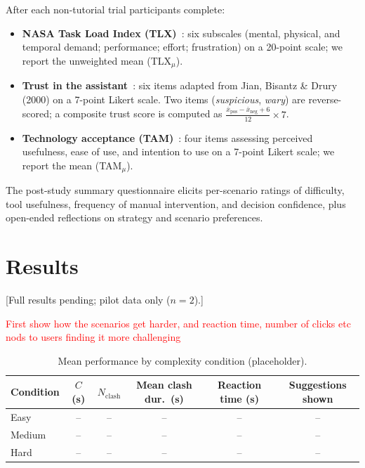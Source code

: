 \documentclass[10pt]{article}
\theoremstyle{definition}
\begin{document}
After each non-tutorial trial participants complete:
\begin{itemize}[noitemsep]
  \item \textbf{NASA Task Load Index (TLX)}~\cite{hart1988nasa}: six subscales (mental, physical, and temporal demand; performance; effort; frustration) on a 20-point scale; we report the unweighted mean (TLX$_\mu$).
  \item \textbf{Trust in the assistant}~\cite{jian2000foundations}: six items adapted from Jian, Bisantz \& Drury (2000) on a 7-point Likert scale. Two items (\textit{suspicious}, \textit{wary}) are reverse-scored; a composite trust score is computed as $\frac{\bar{x}_{\mathrm{pos}} - \bar{x}_{\mathrm{neg}} + 6}{12}\times 7$.
  \item \textbf{Technology acceptance (TAM)}~\cite{davis1989perceived}: four items assessing perceived usefulness, ease of use, and intention to use on a 7-point Likert scale; we report the mean (TAM$_\mu$).
\end{itemize}

The post-study summary questionnaire elicits per-scenario ratings of difficulty, tool usefulness, frequency of manual intervention, and decision confidence, plus open-ended reflections on strategy and scenario preferences.

\section{Results}\label{sec:results}
[Full results pending; pilot data only ($n = 2$).]

\textcolor{red}{First show how the scenarios get harder, and reaction time, number of clicks etc nods to users finding it more challenging}
\begin{table}[ht]
\centering
\caption{Mean performance by complexity condition (placeholder).}
\label{tab:perf}
\begin{tabular}{lccccc}
\toprule
Condition & $C$ (s) & $N_{\mathrm{clash}}$ & Mean clash dur.\ (s)
          & Reaction time (s) & Suggestions shown \\
\midrule
Easy   & -- & -- & -- & -- & -- \\
Medium & -- & -- & -- & -- & -- \\
Hard   & -- & -- & -- & -- & -- \\
\bottomrule
\end{tabular}
\end{table}
\end{document}
